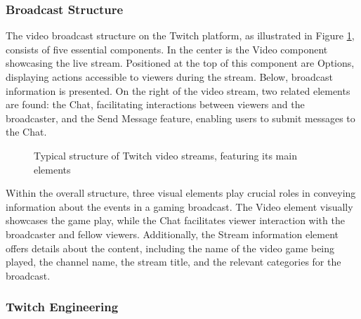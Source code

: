     \subsubsection*{Broadcast Structure}
    The video broadcast structure on the Twitch platform, as illustrated in Figure \ref{fig:TwitchStreamStructure}, consists of five essential components. In the center is the Video component showcasing the live stream. Positioned at the top of this component are Options, displaying actions accessible to viewers during the stream. Below, broadcast information is presented. On the right of the video stream, two related elements are found: the Chat, facilitating interactions between viewers and the broadcaster, and the Send Message feature, enabling users to submit messages to the Chat.

    \begin{figure}[htbp]
        \centering
        \fboxsep=0pt\fboxrule=0.5pt
        \caption{Typical structure of Twitch video streams, featuring its main elements}
        \label{fig:TwitchStreamStructure}
    \end{figure}

    Within the overall structure, three visual elements play crucial roles in conveying information about the events in a gaming broadcast. The Video element visually showcases the game play, while the Chat facilitates viewer interaction with the broadcaster and fellow viewers. Additionally, the Stream information element offers details about the content, including the name of the video game being played, the channel name, the stream title, and the relevant categories for the broadcast.

    \subsubsection*{Twitch Engineering}

